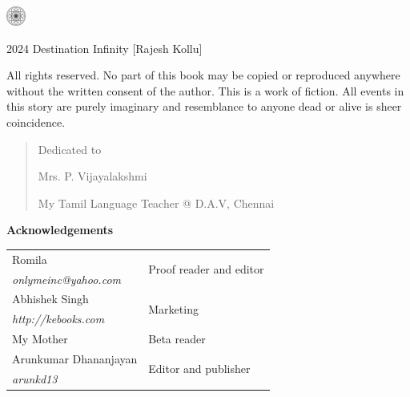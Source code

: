 \begin{center}
\HUGE{\thetitle}
\end{center}
\cleardoublepage

\begin{center}
\HUGE{\thetitle}
\end{center}

\begin{center}
\LARGE{\theauthor}
\end{center}

\vfill

\begin{center}
    \includegraphics[width=18pt]{logo.pdf}
\end{center}
\clearpage

\begingroup
\footnotesize
\setlength{\parindent}{0pt}
\setlength{\parskip}{\baselineskip}

\textcopyright{} 2024 Destination Infinity [Rajesh Kollu]

All rights reserved. No part of this book may be copied or reproduced anywhere
without the written consent of the author. This is a work of fiction. All events
in this story are purely imaginary and resemblance to anyone dead or alive is sheer
coincidence.

\endgroup
\clearpage

\begin{quote}
\begin{center}Dedicated to

\Large
Mrs. P. Vijayalakshmi
\normalsize

My Tamil Language Teacher @ D.A.V, Chennai
\end{center}
\end{quote}

\vfill

\textbf{Acknowledgements}

\footnotesize
\begin{tabular}{ll}
    Romila & \multirow{2}{*}{Proof reader and editor} \\
    \emph{onlymeinc@yahoo.com} & \\
    Abhishek Singh & \multirow{2}{*}{Marketing} \\
    \emph{http://kebooks.com} & \\
    My Mother & Beta reader \\
    Arunkumar Dhananjayan & \multirow{2}{*}{Editor and publisher} \\
    \emph{arunkd13} & \\
\end{tabular}

\clearpage